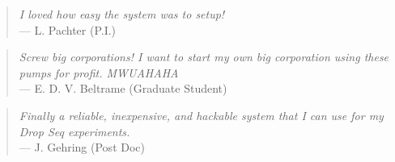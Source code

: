\documentclass[10pt]{article} %
\begin{document}
\begin{minipage}[t]{.66\linewidth}
		\begin{quote}
			\raggedright \textsl{I loved how easy the system was to setup!} \\ \raggedleft--- \textrm{L. Pachter (P.I.)}
		\end{quote}
	
		\begin{quote}
			\raggedright \textsl{Screw big corporations! I want to start my own big corporation using these pumps for profit. MWUAHAHA} \\ \raggedleft--- \textrm{E. D. V. Beltrame (Graduate Student)}
		\end{quote}
	
		\begin{quote}
			\raggedright \textsl{Finally a reliable, inexpensive, and hackable system that I can use for my Drop Seq experiments.} \\ \raggedleft--- \textrm{J. Gehring (Post Doc)}
		\end{quote}
		
		
	\end{minipage}\hfill %
\end{document}
